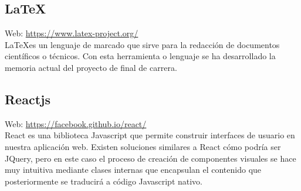 \subsection{\LaTeX}

Web: \url{https://www.latex-project.org/}\\

\LaTeX es un lenguaje de marcado que sirve para la redacción de documentos científicos o técnicos. Con esta herramienta o lenguaje se ha desarrollado la memoria actual del proyecto de final de carrera.

\subsection{Reactjs}


Web: \url{https://facebook.github.io/react/}\\

React es una biblioteca Javascript que permite construir interfaces de usuario en nuestra aplicación web. Existen soluciones similares a React cómo podría ser JQuery, pero en este caso el proceso de creación de componentes visuales se hace muy intuitiva mediante clases internas que encapsulan el contenido que posteriormente se traducirá a código Javascript nativo.\\

